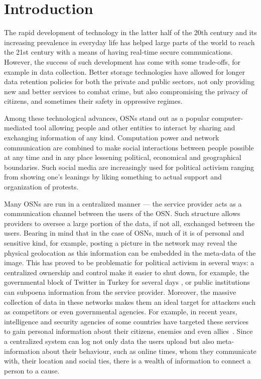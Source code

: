 \section{Introduction}
\label{Introduction}
The rapid development of technology in the latter half of the
20th century and its increasing prevalence in
everyday life has helped large parts of the world to reach the
21st century with a means of having real-time secure
communications.  However, the success of such development has come
with some trade-offs, for example in data collection. Better storage
technologies have allowed for longer data retention policies for both
the private and public sectors, not only providing new and better
services to combat crime, but also compromising the privacy of
citizens, and sometimes their safety in oppressive regimes.

Among these technological advances, \acp{OSN} stand out as a popular
computer-mediated tool allowing people and other entities to interact
by sharing and exchanging information of any kind. Computation power
and network communication are combined to make social interactions
between people possible at any time and in any place lessening
political, economical and geographical boundaries. Such social media
are increasingly used for political activism ranging from showing
one's leanings by liking something to actual support and organization
of protests.

Many \acp{OSN} are run in a centralized manner --- the service
provider acts as a communication channel between the users of the
\ac{OSN}. Such structure allows providers to oversee a large portion
of the data, if not all, exchanged between the users. Bearing in mind
that in the case of \acp{OSN}, much of it is of personal and sensitive
kind, for example, posting a picture in the network may reveal the
physical geolocation as this information can be embedded in the
meta-data of the image. This has proved to be problematic for
political activism in several ways: a centralized ownership and
control make it easier to shut down, for example, the governmental block of Twitter in
Turkey for several days \cite{TwitterBanTurkey}, or public institutions 
can subpoena information from the service provider. Moreover, the massive
collection of data in these networks makes them an ideal target for
attackers such as competitors or even governmental agencies. For
example, in recent years, intelligence and security agencies of
some countries have targeted these services to gain personal
information about their citizens, enemies and even
allies~\cite{Prism}. Since a centralized system can log not only data
the users upload but also meta-information about their behaviour, such
as online times, whom they communicate with, their location and social
ties, there is a wealth of information to connect a person to a cause.

